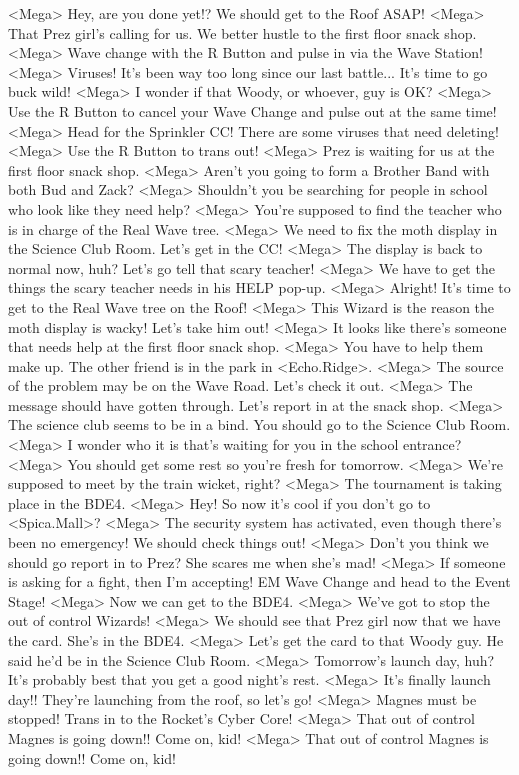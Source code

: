 <Mega> Hey, are you done yet!? We should get to the Roof ASAP! 
<Mega> That Prez girl's calling for us. We better hustle to the first floor snack shop. 
<Mega> Wave change with the R Button and pulse in via the Wave Station! 
<Mega> Viruses! It's been way too long since our last battle... It's time to go buck wild! 
<Mega> I wonder if that Woody, or whoever, guy is OK? 
<Mega> Use the R Button to cancel your Wave Change and pulse out at the same time! 
<Mega> Head for the Sprinkler CC! There are some viruses that need deleting! 
<Mega> Use the R Button to trans out! 
<Mega> Prez is waiting for us at the first floor snack shop. 
<Mega> Aren't you going to form a Brother Band with both Bud and Zack? 
<Mega> Shouldn't you be searching for people in school who look like they need help? 
<Mega> You're supposed to find the teacher who is in charge of the Real Wave tree. 
<Mega> We need to fix the moth display in the Science Club Room. Let's get in the CC! 
<Mega> The display is back to normal now, huh? Let's go tell that scary teacher! 
<Mega> We have to get the things the scary teacher needs in his HELP pop-up. 
<Mega> Alright! It's time to get to the Real Wave tree on the Roof! 
<Mega> This Wizard is the reason the moth display is wacky! Let's take him out! 
<Mega> It looks like there's someone that needs help at the first floor snack shop. 
<Mega> You have to help them make up. The other friend is in the park in <Echo.Ridge>. 
<Mega> The source of the problem may be on the Wave Road. Let's check it out. 
<Mega> The message should have gotten through. Let's report in at the snack shop. 
<Mega> The science club seems to be in a bind. You should go to the Science Club Room. 
<Mega> I wonder who it is that's waiting for you in the school entrance? 
<Mega> You should get some rest so you're fresh for tomorrow. 
<Mega> We're supposed to meet by the train wicket, right? 
<Mega> The tournament is taking place in the {BD}{E4}. 
<Mega> Hey! So now it's cool if you don't go to <Spica.Mall>? 
<Mega> The security system has activated, even though 
there's been no emergency! We should check things out! 
<Mega> Don't you think we should go report in to Prez? She scares me when she's mad! 
<Mega> If someone is asking for a fight, then I'm accepting! 
EM Wave Change and head to the Event Stage! 
<Mega> Now we can get to the {BD}{E4}. 
<Mega> We've got to stop the out of control Wizards! 
<Mega> We should see that Prez girl now that we have the card. She's in the {BD}{E4}. 
<Mega> Let's get the card to that Woody guy. He said he'd be in the Science Club Room. 
<Mega> Tomorrow's launch day, huh? It's probably best that you get a good night's rest. 
<Mega> It's finally launch day!! They're launching from the roof, so let's go! 
<Mega> Magnes must be stopped! Trans in to the Rocket's Cyber Core! 
<Mega> That out of control Magnes is going down!! Come on, kid! 
<Mega> That out of control Magnes is going down!! Come on, kid! 
